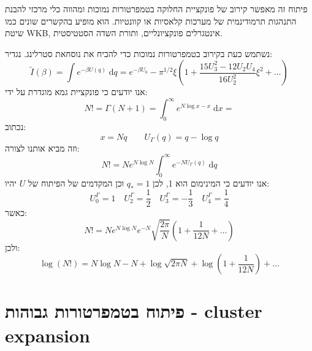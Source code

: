 \documentclass{tstextbook}
\begin{document}
\begin{remark}
פיתוח זה מאפשר קירוב של פונקציית החלוקה בטמפרטורות נמוכות ומהווה כלי מרכזי להבנת התנהגות תרמודינמית של מערכות קלאסיות או קוונטיות. הוא מופיע בהקשרים שונים כמו שיטת WKB, אינטגרלים פונקציונליים, ותורת השדה הסטטיסטית.

\end{remark}
\begin{example}
נשתמש כעת בקירוב בטמפרטורות נמוכות כדי להכיח את נוסחאת סטרלינג.
נגדיר:
$$\tilde{I}(\beta)=\int e^{ -\beta U(q) } \;\mathrm{d}q=e^{ -\beta U_{0} }-\pi^{1/2}\xi\left( 1+ \frac{15U_{3}^{2}-12U_{2}U_{4}}{16 U_{2}^{2}}\xi^{2}+\dots \right)$$
אנו יודעים כי פונקציית גמא מוגדרת על ידי:
$$N! = \Gamma(N+1)=\int _{0}^{\infty}e^{ N\log x-x } \;\mathrm{d}x=$$
נכתוב:
$$x=Nq \qquad U_{\Gamma}(q)=q-\log q$$
וזה מביא אותנו לצורה:
$$N! = Ne^{ N\log N }\int _{0}^{\infty}e^{ -NU_{\Gamma}(q) } \;\mathrm{d}q$$
אנו יודעים כי המינימום הוא 1, לכן \(q_{*}=1\) וכן המקדמים של הפיתוח של \(U\) יהיו:
$$U_{0}^{\Gamma} = 1\quad U_{2}^{\Gamma}=\frac{1}{2}\quad U_{3}^{\Gamma}=-\frac{1}{3}\quad U_{4}^{\Gamma}=\frac{1}{4}$$
כאשר:
$$N! = Ne^{ N\log N }e^{ -N }\sqrt{ \frac{2\pi}{N} }\left( 1+\frac{1}{12N}+\dots \right)$$
ולכן:
$$\log(N!)=N\log N-N+\log \sqrt{ 2\pi N }+\log\left( 1+\frac{1}{12N} \right)+\dots$$

\end{example}
\section{פיתוח בטמפרטורות גבוהות - cluster expansion}
\end{document}
